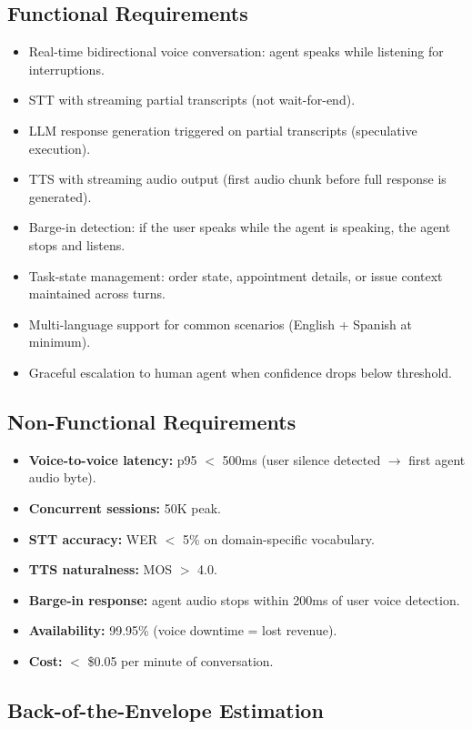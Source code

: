 \subsection*{Functional Requirements}
\begin{itemize}
  \item Real-time bidirectional voice conversation: agent speaks while listening for interruptions.
  \item STT with streaming partial transcripts (not wait-for-end).
  \item LLM response generation triggered on partial transcripts (speculative execution).
  \item TTS with streaming audio output (first audio chunk before full response is generated).
  \item Barge-in detection: if the user speaks while the agent is speaking, the agent stops and listens.
  \item Task-state management: order state, appointment details, or issue context maintained across turns.
  \item Multi-language support for common scenarios (English + Spanish at minimum).
  \item Graceful escalation to human agent when confidence drops below threshold.
\end{itemize}

\subsection*{Non-Functional Requirements}
\begin{itemize}
  \item \textbf{Voice-to-voice latency:} p95 $<$ 500ms (user silence detected $\rightarrow$ first agent audio byte).
  \item \textbf{Concurrent sessions:} 50K peak.
  \item \textbf{STT accuracy:} WER $<$ 5\% on domain-specific vocabulary.
  \item \textbf{TTS naturalness:} MOS $>$ 4.0.
  \item \textbf{Barge-in response:} agent audio stops within 200ms of user voice detection.
  \item \textbf{Availability:} 99.95\% (voice downtime = lost revenue).
  \item \textbf{Cost:} $<$ \$0.05 per minute of conversation.
\end{itemize}

\subsection*{Back-of-the-Envelope Estimation}

